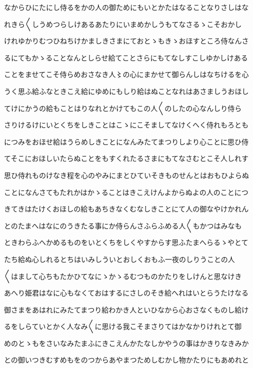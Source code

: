 \documentclass[a4paper,11pt,landscape]{ltjtarticle}
\begin{document}
なからひにたにし侍るをかの人の御ためにもいとかたはなることなりさしはな
\par\medskip
れきら〱しうめつらしけあるあたりにいまめかしうもてなさるゝこそおかし
\par\medskip
けれゆかりむつひねちけかましきさまにておとゝもきゝおほすところ侍なんさ
\par\medskip
るにてもかゝることなんとしらせ給てことさらにもてなしすこしゆかしけある
\par\medskip
ことをませてこそ侍らめおさなき人〻の心にまかせて御らんしはなちけるを心
\par\medskip
うく思ふ給ふなときこえ給にゆめにもしり給はぬことなれはあさましうおほし
\par\medskip
てけにかうの給もことはりなれとかけてもこの人〱のしたの心なんしり侍ら
\par\medskip
さりけるけにいとくちをしきことはこゝにこそましてなけくへく侍れもろとも
\par\medskip
につみをおほせ給はうらめしきことになんみたてまつりしより心ことに思ひ侍
\par\medskip
てそこにおほしいたらぬことをもすくれたるさまにもてなさむとこそ人しれす
\par\medskip
思ひ侍れものけなき程を心のやみにまとひていそきものせんとはおもひよらぬ
\par\medskip
ことになんさてもたれかはかゝることはきこえけんよからぬよの人のことにつ
\par\medskip
きてきはたけくおほしの給もあちきなくむなしきことにて人の御なやけかれん
\par\medskip
とのたまへはなにのうきたる事にか侍らんさふらふめる人〱もかつはみなも
\par\medskip
ときわらふへかめるものをいとくちをしくやすからす思ふたまへらるゝやとて
\par\medskip
たち給ぬ心しれるとちはいみしういとおしくおもふ一夜のしりうことの人
\par\medskip
〱はまして心ちもたかひてなにゝかゝるむつものかたりをしけんと思なけき
\par\medskip
あへり姫君はなに心もなくておはするにさしのそき給へれはいとらうたけなる
\par\medskip
御さまをあはれにみたてまつり給わかき人といひなから心おさなくものし給け
\par\medskip
るをしらていとかく人なみ〱に思ける我こそまさりてはかなかりけれとて御
\par\medskip
めのとゝもをさいなみたまふにきこえんかたなしかやうの事はかきりなきみか
\par\medskip
との御いつきむすめもをのつからあやまつためしむかし物かたりにもあめれと
\end{document}
